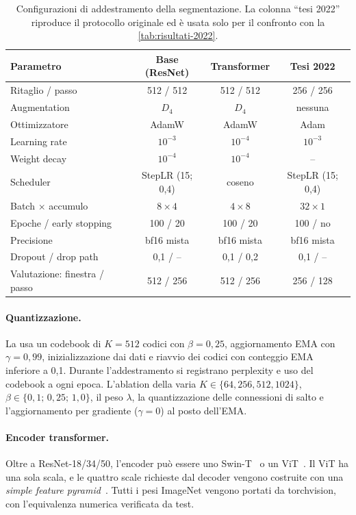 \begin{table}[t]
  \centering
  \small
  \caption[Configurazioni di addestramento della segmentazione]{Configurazioni di addestramento
    della segmentazione. La colonna \enquote{tesi 2022} riproduce il protocollo originale ed è
    usata solo per il confronto con la \cref{tab:risultati-2022}.}
  \label{tab:iperparametri}
  \begin{tabular}{|l|c|c|c|}
    \hline
    \textbf{Parametro} & \textbf{Base (ResNet)} & \textbf{Transformer} & \textbf{Tesi 2022} \\
    \hline
    Ritaglio / passo & 512 / 512 & 512 / 512 & 256 / 256 \\
    Augmentation & $D_4$ & $D_4$ & nessuna \\
    Ottimizzatore & AdamW & AdamW & Adam \\
    Learning rate & $10^{-3}$ & $10^{-4}$ & $10^{-3}$ \\
    Weight decay & $10^{-4}$ & $10^{-4}$ & -- \\
    Scheduler & StepLR (15; 0,4) & coseno & StepLR (15; 0,4) \\
    Batch $\times$ accumulo & $8\times4$ & $4\times8$ & $32\times1$ \\
    Epoche / early stopping & 100 / 20 & 100 / 20 & 100 / no \\
    Precisione & bf16 mista & bf16 mista & bf16 mista \\
    Dropout / drop path & 0,1 / -- & 0,1 / 0,2 & 0,1 / -- \\
    Valutazione: finestra / passo & 512 / 256 & 512 / 256 & 256 / 128 \\
    \hline
  \end{tabular}
\end{table}

\paragraph{Quantizzazione.}
La \maresunetvq{} usa un codebook di $K=512$ codici con $\beta=0{,}25$, aggiornamento EMA con
$\gamma=0{,}99$, inizializzazione dai dati e riavvio dei codici con conteggio EMA inferiore a
0,1. Durante l'addestramento si registrano perplexity e uso del codebook a ogni epoca.
L'ablation della  varia $K\in\{64,256,512,1024\}$, $\beta\in\{0{,}1;\,0{,}25;\,1{,}0\}$,
il peso $\lambda$, la quantizzazione delle connessioni di salto e l'aggiornamento per gradiente
($\gamma=0$) al posto dell'EMA.

\paragraph{Encoder transformer.}
Oltre a ResNet-18/34/50, l'encoder può essere uno Swin-T~\cite{liu2021swin} o un
ViT~\cite{dosovitskiy2021vit}. Il ViT ha una sola scala, e le quattro scale richieste dal decoder
vengono costruite con una \emph{simple feature pyramid}~\cite{li2022vitdet}. Tutti i pesi
ImageNet vengono portati da torchvision, con l'equivalenza numerica verificata da test.

